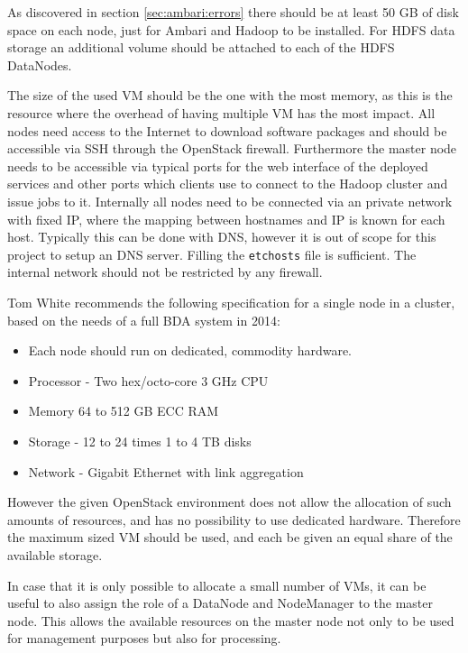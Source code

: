 As discovered in section \vref{sec:ambari:errors} there should be at least 50 \ac{GB} of disk space on each node, 
just for Ambari and Hadoop to be installed.
For \ac{HDFS} data storage an additional volume should be attached to each of the \ac{HDFS} DataNodes.

The size of the used \acs{VM} should be the one with the most memory, 
as this is the resource where the overhead of having multiple \acs{VM} has the most impact.
All nodes need access to the Internet to download software packages and should be accessible via \ac{SSH} through the OpenStack firewall.
Furthermore the master node needs to be accessible via typical ports for the web interface of the deployed services and other ports which clients use to connect to the Hadoop cluster and issue jobs to it.
Internally all nodes need to be connected via an private network with fixed \acs{IP}, where the mapping between hostnames and \acs{IP} is known for each host. Typically this can be done with \ac{DNS}, however it is out of scope for this project to setup an \ac{DNS} server. Filling the \texttt{\/etc\/hosts} file is sufficient.
The internal network should not be restricted by any firewall.

Tom White recommends the following specification for a single node in a cluster, based on the needs of a full \ac{BDA} system in 2014:\\

\begin{itemize}
    \item Each node should run on dedicated, commodity hardware.
    \item Processor - Two hex/octo-core 3 GHz \acs{CPU}
    \item Memory 64 to 512 \ac{GB} \ac{ECC} \ac{RAM}
    \item Storage - 12 to 24 times 1 to 4 \ac{TB} disks
    \item Network - Gigabit Ethernet with link aggregation
\end{itemize}
\autocite{white2015hadoop}

However the given OpenStack environment does not allow the allocation of such amounts of resources, and has no possibility to use dedicated hardware. 
Therefore the maximum sized \acs{VM} should be used, and each be given an equal share of the available storage.

In case that it is only possible to allocate a small number of \acp{VM}, it can be useful to also assign the role of a DataNode and NodeManager to the master node. This allows the available resources on the master node not only to be used for management purposes but also for processing.

